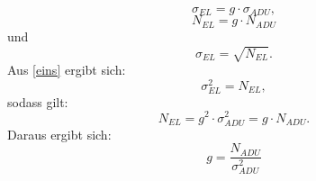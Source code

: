 \begin{equation}
\sigma_{EL} = g \cdot \sigma_{ADU}, 
\label{eins}
\end{equation}
\begin{equation}
N_{EL} = g \cdot N_{ADU}
\end{equation}
und 
\begin{equation}
\sigma_{EL} = \sqrt{N_{EL}}. 
\end{equation}
Aus \ref{eins} ergibt sich: 
\begin{equation}
\sigma_{EL}^2 = N_{EL}, 
\end{equation}
sodass gilt: 
\begin{equation}
N_{EL} = g^2 \cdot \sigma_{ADU}^2 = g \cdot N_{ADU}. 
\end{equation}
Daraus ergibt sich: 
\begin{equation}
g = \frac{N_{ADU}}{\sigma_{ADU}^2}
\end{equation}

